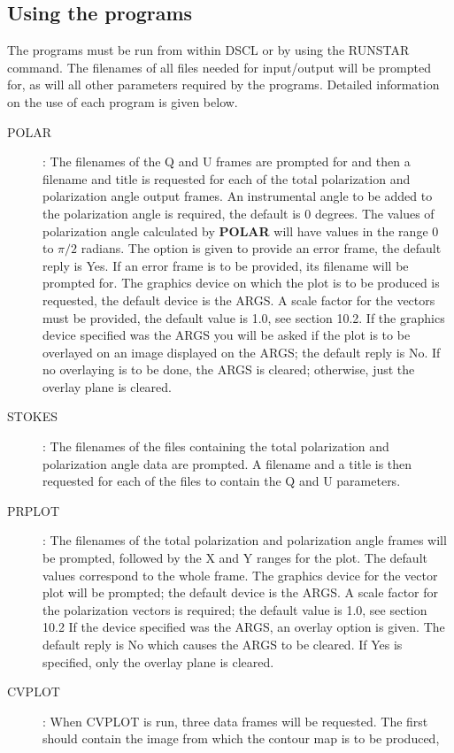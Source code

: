 \subsection {Using the programs}
The programs must be run from within DSCL or by using the RUNSTAR command.
The filenames of all files needed for input/output will be prompted for, as will
all other parameters required by the programs.
Detailed information on the use of each program is given below.
\begin{description}
\item [POLAR]:
The filenames of the Q and U frames are prompted for and then a filename and
title is requested for each of the total polarization and polarization angle
output frames.
An instrumental angle to be added to the polarization angle is required, the
default is 0 degrees.
The values of polarization angle calculated by {\bf POLAR} will have values in
the range 0 to $\pi/2$ radians.
The option is given to provide an error frame, the default reply is Yes.
If an error frame is to be provided, its filename will be prompted for.
The graphics device on which the plot is to be produced is requested, the
default device is the ARGS.
A scale factor for the vectors must be provided, the default value is 1.0, see
section 10.2.
If the graphics device specified was the ARGS you will be asked if the plot is
to be overlayed on an image displayed on the ARGS; the default reply is No.
If no overlaying is to be done, the ARGS is cleared; otherwise, just the overlay
plane is cleared.
\item [STOKES]:
The filenames of the files containing the total polarization and polarization
angle data are prompted.
A filename and a title is then requested for each of the files to contain the
Q and U parameters.
\item [PRPLOT]:
The filenames of the total polarization and polarization angle frames will be
prompted, followed by the X and Y ranges for the plot.
The default values correspond to the whole frame.
The graphics device for the vector plot will be prompted; the default device is
the ARGS.
A scale factor for the polarization vectors is required; the default value is
1.0, see section 10.2
If the device specified was the ARGS, an overlay option is given.
The default reply is No which causes the ARGS to be cleared.
If Yes is specified, only the overlay plane is cleared.
\item [CVPLOT]:
When CVPLOT is run, three data frames will be requested.
The first should contain the image from which the contour map is to be produced,

\end{description}
